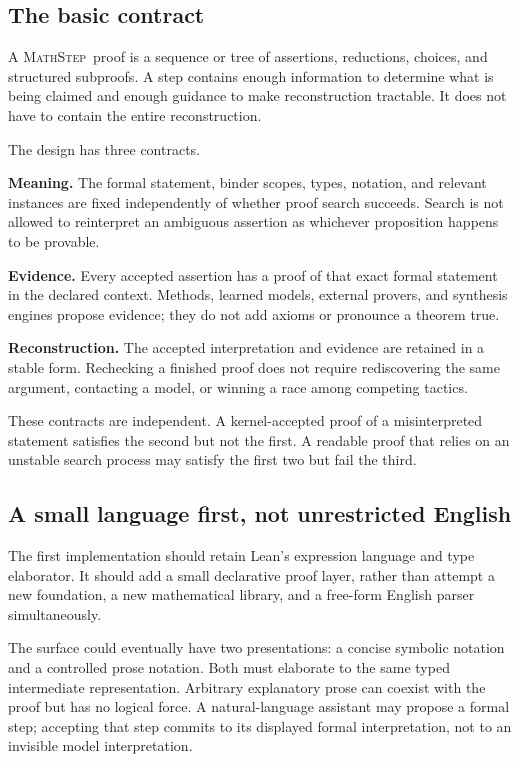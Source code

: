 \documentclass[11pt,a4paper]{article}
\theoremstyle{remark}
\newcommand{\ms}{\textsc{MathStep}}
\begin{document}
\subsection{The basic contract}
A \ms\ proof is a sequence or tree of assertions, reductions, choices, and structured subproofs. A step contains enough information to determine what is being claimed and enough guidance to make reconstruction tractable. It does not have to contain the entire reconstruction.

The design has three contracts.

\textbf{Meaning.} The formal statement, binder scopes, types, notation, and relevant instances are fixed independently of whether proof search succeeds. Search is not allowed to reinterpret an ambiguous assertion as whichever proposition happens to be provable.

\textbf{Evidence.} Every accepted assertion has a proof of that exact formal statement in the declared context. Methods, learned models, external provers, and synthesis engines propose evidence; they do not add axioms or pronounce a theorem true.

\textbf{Reconstruction.} The accepted interpretation and evidence are retained in a stable form. Rechecking a finished proof does not require rediscovering the same argument, contacting a model, or winning a race among competing tactics.

These contracts are independent. A kernel-accepted proof of a misinterpreted statement satisfies the second but not the first. A readable proof that relies on an unstable search process may satisfy the first two but fail the third.

\subsection{A small language first, not unrestricted English}
The first implementation should retain Lean's expression language and type elaborator. It should add a small declarative proof layer, rather than attempt a new foundation, a new mathematical library, and a free-form English parser simultaneously.

The surface could eventually have two presentations: a concise symbolic notation and a controlled prose notation. Both must elaborate to the same typed intermediate representation. Arbitrary explanatory prose can coexist with the proof but has no logical force. A natural-language assistant may propose a formal step; accepting that step commits to its displayed formal interpretation, not to an invisible model interpretation.
\end{document}
